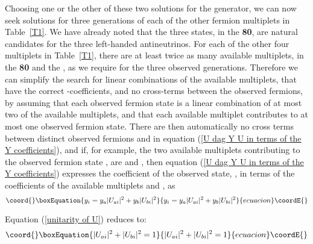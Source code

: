 \documentclass[a4paper,12pt,oneside]{article}
\begin{document}
Choosing one or the other of these two solutions for the
\coordHE{} generator, we can now seek solutions for three
generations of each of the other fermion multiplets in \mbox{Table 
\ref{T1}}.  We have already noted that the three 
\coordHE{} states, in the \textbf{80}, are natural
candidates for the three left-handed antineutrinos.  For each of the
other four multiplets in \mbox{Table \ref{T1}}, there are at least 
twice as
many available multiplets, in the \textbf{80} and the 
\coordHE{}, as we require for the three observed
generations.  Therefore we can simplify the search for linear
combinations of the available multiplets, that have the correct
\coordHE{}-coefficients, and no cross-terms between the observed fermions,
by assuming that each observed fermion state is a linear combination
of at most two of the available multiplets, and that each available
multiplet contributes to at most one observed fermion state.  There
are then automatically no cross terms between distinct observed
fermions \coordHE{} and \coordHE{} in equation
(\ref{U dag Y U in terms of the Y coefficients}), and if, for 
example, the two available multiplets contributing to the observed
fermion state \coordHE{}, are \coordHE{} and \coordHE{}, then equation
(\ref{U dag Y U in terms of the Y coefficients}) expresses the 
\coordHE{} coefficient of the observed state, \coordHE{}, in terms of the \coordHE{}
coefficients of the available multiplets \coordHE{} and \coordHE{}, as
\begin{equation}\coord{}\boxEquation{\label{Y coefficient of a convenient observed state}
y_i=y_a\vert U_{ai}\vert^2+y_b\vert U_{bi}\vert^2
}{y_i=y_a\vert U_{ai}\vert^2+y_b\vert U_{bi}\vert^2
}{ecuacion}\coordE{}\end{equation}

Equation (\ref{unitarity of U}) reduces to:
\begin{equation}\coord{}\boxEquation{\label{unitarity for a convenient observed state}
\vert U_{ai}\vert^2+\vert U_{bi}\vert^2=1
}{\vert U_{ai}\vert^2+\vert U_{bi}\vert^2=1
}{ecuacion}\coordE{}\end{equation}
\end{document}
